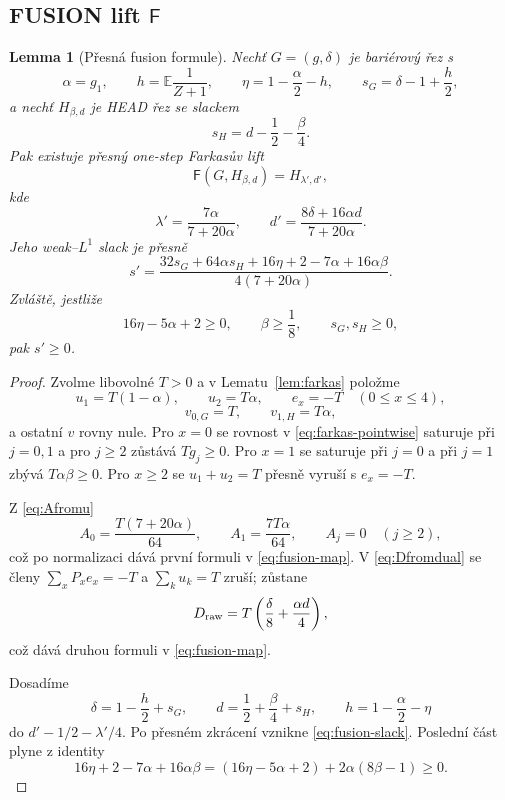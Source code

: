\documentclass[11pt,a4paper]{article}
\newtheorem{lemma}[theorem]{Lemma}
\theoremstyle{remark}
\newcommand{\Fop}{\mathsf F}
\begin{document}
\subsection{FUSION lift $\Fop$}

\begin{lemma}[Přesná fusion formule]\label{lem:F}
Nechť $G=(g,\delta)$ je bariérový řez s
\[
\alpha=g_1,
\qquad
h=\mathbb E\frac1{Z+1},
\qquad
\eta=1-\frac\alpha2-h,
\qquad
s_G=\delta-1+\frac h2,
\]
a nechť $H_{\beta,d}$ je HEAD řez se slackem
\[
s_H=d-\frac12-\frac\beta4.
\]
Pak existuje přesný one-step Farkasův lift
\[
\Fop(G,H_{\beta,d})=H_{\lambda',d'},
\]
kde
\begin{equation}\label{eq:fusion-map}
\boxed{
\lambda'=\frac{7\alpha}{7+20\alpha},
\qquad
d'=\frac{8\delta+16\alpha d}{7+20\alpha}.}
\end{equation}
Jeho weak--$L^1$ slack je přesně
\begin{equation}\label{eq:fusion-slack}
\boxed{
s'
=\frac{32s_G+64\alpha s_H+16\eta+2-7\alpha+16\alpha\beta}
{4(7+20\alpha)}.}
\end{equation}
Zvláště, jestliže
\begin{equation}\label{eq:fusion-sufficient}
16\eta-5\alpha+2\ge0,
\qquad
\beta\ge\frac18,
\qquad
s_G,s_H\ge0,
\end{equation}
pak $s'\ge0$.
\end{lemma}

\begin{proof}
Zvolme libovolné $T>0$ a v Lematu~\ref{lem:farkas} položme
\[
u_1=T(1-\alpha),
\qquad
u_2=T\alpha,
\qquad
e_x=-T\quad(0\le x\le4),
\]
\[
v_{0,G}=T,
\qquad
v_{1,H}=T\alpha,
\]
a ostatní $v$ rovny nule. Pro $x=0$ se rovnost v
\eqref{eq:farkas-pointwise} saturuje při $j=0,1$ a pro $j\ge2$ zůstává
$Tg_j\ge0$. Pro $x=1$ se saturuje při $j=0$ a při $j=1$ zbývá
$T\alpha\beta\ge0$. Pro $x\ge2$ se $u_1+u_2=T$ přesně vyruší s $e_x=-T$.

Z \eqref{eq:Afromu}
\[
A_0=\frac{T(7+20\alpha)}{64},
\qquad
A_1=\frac{7T\alpha}{64},
\qquad
A_j=0\quad(j\ge2),
\]
což po normalizaci dává první formuli v \eqref{eq:fusion-map}. V
\eqref{eq:Dfromdual} se členy $\sum_xP_xe_x=-T$ a $\sum_ku_k=T$ zruší;
zůstane
\[
D_{\rm raw}=T\left(\frac\delta8+\frac{\alpha d}{4}\right),
\]
což dává druhou formuli v \eqref{eq:fusion-map}.

Dosadíme
\[
\delta=1-\frac h2+s_G,
\qquad
d=\frac12+\frac\beta4+s_H,
\qquad
h=1-\frac\alpha2-\eta
\]
do $d'-1/2-\lambda'/4$. Po přesném zkrácení vznikne
\eqref{eq:fusion-slack}. Poslední část plyne z identity
\[
16\eta+2-7\alpha+16\alpha\beta
=(16\eta-5\alpha+2)+2\alpha(8\beta-1)\ge0.
\]
\end{proof}
\end{document}
